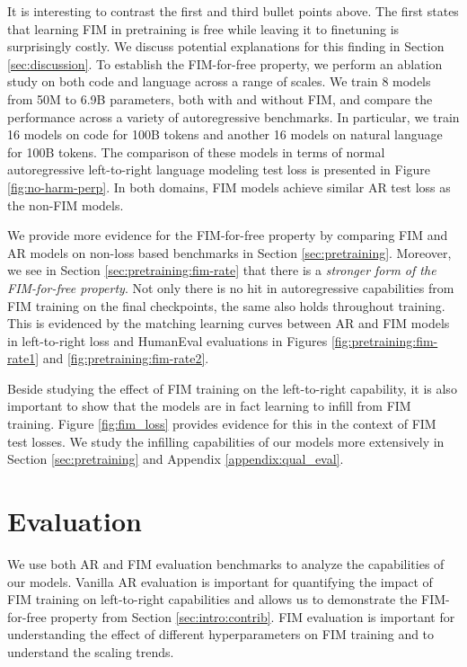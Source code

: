 \documentclass[postscript]{article}
\begin{document}
 It is interesting to contrast the first and third bullet points above. The first states that learning FIM in pretraining is free while leaving it to finetuning is surprisingly costly. We discuss potential explanations for this finding in Section \ref{sec:discussion}. To establish the FIM-for-free property, we perform an ablation study on both code and language across a range of scales. We train 8 models from 50M to 6.9B parameters, both with and without FIM, and compare the performance across a variety of autoregressive benchmarks. In particular, we train 16 models on code for 100B tokens and another 16 models on natural language for 100B tokens. The comparison of these models in terms of normal autoregressive left-to-right language modeling test loss is presented in Figure \ref{fig:no-harm-perp}. In both domains, FIM models achieve similar AR test loss as the non-FIM models.  

We provide more evidence for the FIM-for-free property by comparing FIM and AR models on non-loss based benchmarks in Section \ref{sec:pretraining}. Moreover, we see in Section \ref{sec:pretraining:fim-rate} that there is a \emph{stronger form of the FIM-for-free property}. Not only there is no hit in autoregressive capabilities from FIM training on the final checkpoints, the same also holds throughout training. This is evidenced by the matching learning curves between AR and FIM models in left-to-right loss and HumanEval evaluations in Figures \ref{fig:pretraining:fim-rate1} and \ref{fig:pretraining:fim-rate2}.

Beside studying the effect of FIM training on the left-to-right capability, it is also important to show that the models are in fact learning to infill from FIM training. Figure \ref{fig:fim_loss} provides evidence for this in the context of FIM test losses. We study the infilling capabilities of our models more extensively in Section \ref{sec:pretraining} and Appendix \ref{appendix:qual_eval}.

\section{Evaluation}
\label{sec:setup:evals}

We use both AR and FIM evaluation benchmarks to analyze the capabilities of our models. Vanilla AR evaluation is important for quantifying the impact of FIM training on left-to-right capabilities and allows us to demonstrate the FIM-for-free property from Section \ref{sec:intro:contrib}. FIM evaluation is important for understanding the effect of different hyperparameters on FIM training and to understand the scaling trends.
\end{document}
